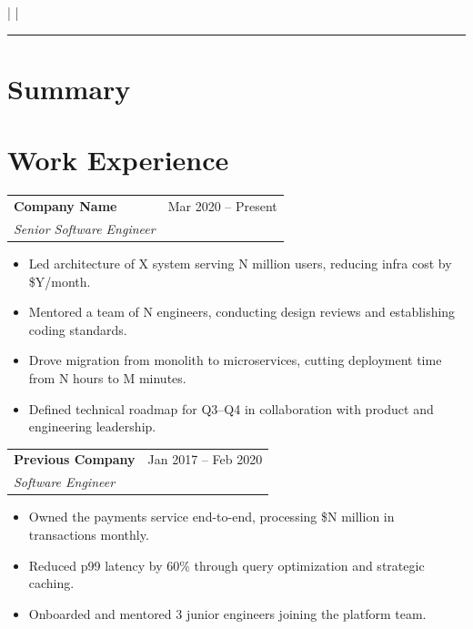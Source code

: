 \documentclass[10pt, a4paper]{article}
\makeatletter
\newcommand{\contactitem}[1]{\small #1}
\newcommand{\workentry}[4]{%
  \noindent
  \begin{tabularx}{\linewidth}{@{}X r@{}}
    \textbf{#1} & \textcolor{subtle}{\small #3} \\
    \textit{\small #2} &
  \end{tabularx}
  \vspace{1pt}
  #4
  \vspace{8pt}
}
\makeatother
\begin{document}

\begin{center}
  {\LARGE\bfseries\color{accent} \VarName}\\[4pt]
  {\small \VarRole}\\[6pt]
  \contactitem{\VarEmail}
  \quad\textcolor{subtle}{|}\quad
  \contactitem{\VarPhone}
  \quad\textcolor{subtle}{|}\quad
  \contactitem{\VarLocation}
\end{center}

\vspace{4pt}
\textcolor{accent}{\rule{\linewidth}{0.8pt}}
\vspace{6pt}

\section{Summary}
\VarSummary

\section{Work Experience}
\workentry{Company Name}{Senior Software Engineer}{Mar 2020 -- Present}{%
  \begin{itemize}
    \item Led architecture of X system serving N million users, reducing infra cost by \$Y/month.
    \item Mentored a team of N engineers, conducting design reviews and establishing coding standards.
    \item Drove migration from monolith to microservices, cutting deployment time from N hours to M minutes.
    \item Defined technical roadmap for Q3--Q4 in collaboration with product and engineering leadership.
  \end{itemize}
}

\workentry{Previous Company}{Software Engineer}{Jan 2017 -- Feb 2020}{%
  \begin{itemize}
    \item Owned the payments service end-to-end, processing \$N million in transactions monthly.
    \item Reduced p99 latency by 60\% through query optimization and strategic caching.
    \item Onboarded and mentored 3 junior engineers joining the platform team.
  \end{itemize}
}
\end{document}
